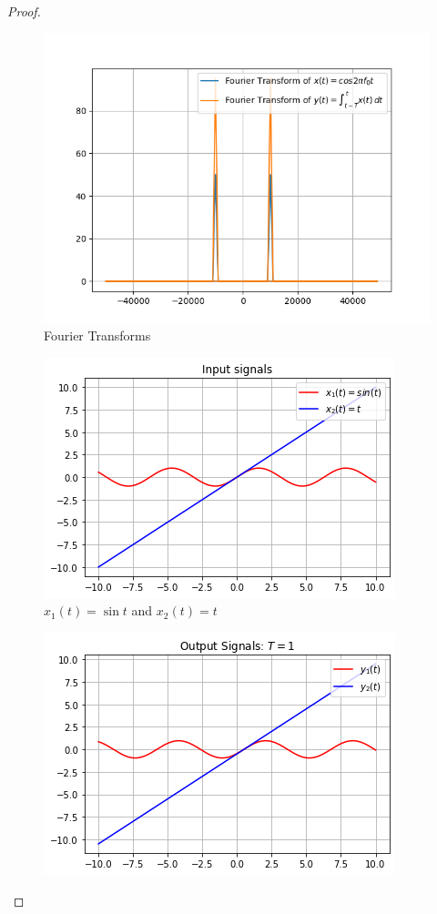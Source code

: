 \documentclass[journal,12pt,twocolumn]{IEEEtran}
\begin{document}
\begin{proof}
\begin{enumerate}
\begin{figure}[!ht]
 \includegraphics[width=\columnwidth]{graphs/fourier.png}
 \caption{Fourier Transforms}
 \end{figure}
\begin{figure}[!ht]
\centering
 \includegraphics[width=\columnwidth]{graphs/input_signals.png}
 \caption{$x_1(t) = \sin{t}$ and $x_2(t) = t$}
 \end{figure}
\begin{figure}[!ht]
\centering
 \includegraphics[width=\columnwidth]{graphs/output_signals.png}

\end{figure}
\end{enumerate}
\end{proof}
\end{document}
